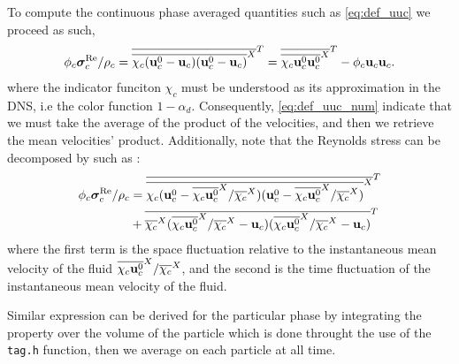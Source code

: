 To compute the continuous phase averaged quantities such as \ref{eq:def_uuc} we proceed as such,
\begin{equation}
    \phi_c \bm{\sigma}^{\text{Re}}_c /\rho_c
    = \overline{\overline{\chi_c (\textbf{u}_c^0 -\textbf{u}_c ) (\textbf{u}_c^0 -\textbf{u}_c)}^X}^T
    = \overline{\overline{\chi_c \textbf{u}_c^0 \textbf{u}_c^0}^X}^T
    -  \phi_c  \textbf{u}_c \textbf{u}_c.
    \label{eq:def_uuc_num} 
\end{equation}
where the indicator funciton $\chi_c$ must be understood as its approximation in the DNS, i.e the color function $1 - \alpha_d$. 
Consequently, \ref{eq:def_uuc_num} indicate that we must take the average of the product of the velocities, and then we retrieve the mean velocities' product. 
Additionally,  note that the Reynolds stress can be decomposed by such as : 
\begin{align*}
    \phi_c \bm{\sigma}^{\text{Re}}_c /\rho_c
    &= 
    \overline{\overline{\chi_c (\textbf{u}_c^0 -\overline{\chi_c\textbf{u}_c^0}^X / \overline{\chi_c}^X ) (\textbf{u}_c^0 -\overline{\chi_c\textbf{u}_c^0}^X / \overline{\chi_c}^X )}^X}^T\\
    &+ \overline{\overline{\chi_c}^X (\overline{\chi_c\textbf{u}_c^0}^X / \overline{\chi_c}^X - \textbf{u}_c ) (\overline{\chi_c\textbf{u}_c^0}^X / \overline{\chi_c}^X - \textbf{u}_c)}^T\\
\end{align*}
where the first term is the space fluctuation relative to the instantaneous mean velocity of the fluid $\overline{\chi_c\textbf{u}_c^0}^X / \overline{\chi_c}^X$, and the second is the time fluctuation of the instantaneous mean velocity of the fluid. 

Similar expression can be derived for the particular phase by integrating the property over the volume of the particle which is done throught the use of the \texttt{tag.h} function, then we average on each particle at all time.



